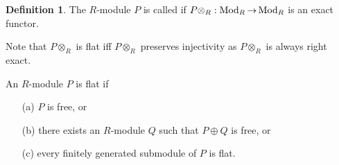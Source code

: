 \documentclass[11pt]{book}
\theoremstyle{definition}   \newtheorem{defn}[counter]{Definition} %
\DeclareMathOperator{\ra}{\rightarrow}   \DeclareMathOperator{\Poly}{\mathbf{P}}   \DeclareMathOperator{\spn}{\textnormal{span}}   \DeclareMathOperator{\aut}{\textnormal{Aut}}
\newcommand{\vs}{\vspace{8pt}}
\numberwithin{counter}{chapter}
\begin{document}
\vs

\begin{defn}
The $R$-module $P$ is called  if $P \otimes_R : \tn{Mod}_R \ra \tn{Mod}_R$ is an exact functor. 
\end{defn}

\vs

\begin{remark*}
Note that $P \otimes_R$ is flat iff $P \otimes_R$ preserves injectivity as $P \otimes_R$ is always right exact.
\end{remark*}

\vs

\begin{lemma}
An $R$-module $P$ is flat if
\begin{enumerate}
\item[(a)] $P$ is free, or
\item[(b)] there exists an $R$-module $Q$ such that $P \oplus Q$ is free, or
\item[(c)] every finitely generated submodule of $P$ is flat.
\end{enumerate}
\end{lemma}
\end{document}
